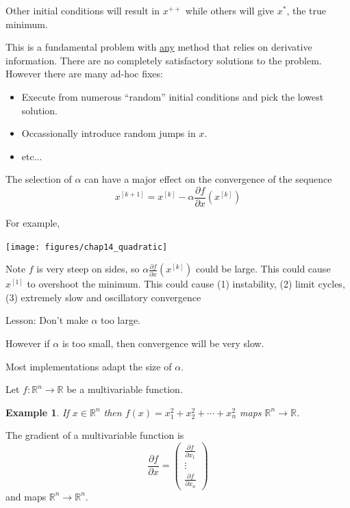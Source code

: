 \documentclass{article}
\newtheorem{example}[theorem]{Example}
\begin{document}
	Other initial conditions will result in 
	$x^{++}$ while others will give $x^\ast$, the true minimum.
	
	
	This is a fundamental problem with \underline{any} method that relies on derivative information.  There are no completely satisfactory solutions to the problem.  However there are many ad-hoc fixes:
		\begin{itemize}
		\item Execute from numerous ``random'' initial conditions and pick the lowest solution.
		\item Occassionally introduce random jumps in $x$.
		\item etc...
		\end{itemize}

\par{}
	The selection of $\alpha$ can have a major effect on the convergence of the sequence
	\[ 
		x^{[k+1]} = x^{[k]} - \alpha \frac{\partial f}{\partial x}(x^{[k]}) 
	\]
	
	For example,
	\begin{center}
		\texttt{[image: figures/chap14\_quadratic]}
	\end{center}
	Note $f$ is very steep on sides, so $\alpha \frac{\partial f}{\partial x}(x^{[k]})$ could be large.  This could cause $x^{[1]}$ to overshoot the minimum.  This could cause (1) instability, (2) limit cycles, (3) extremely slow and oscillatory convergence	

	{\color{blue}Lesson:}  
		Don't make $\alpha$ too large.
		
	
	However if $\alpha$ is too small, then convergence will be very slow.
	
	
	Most implementations adapt the size of $\alpha$.

	Let $f:\mathbb{R}^n\to\mathbb{R}$ be a multivariable function.
	\begin{example}
		If $x \in \mathbb{R}^n$ then 
		$f(x) = x_1^2 + x_2^2 + \cdots + x_n^2$ maps $\mathbb{R}^n\to\mathbb{R}$.	
	\end{example}
	The gradient of a multivariable function is
	\[ 
		\frac{\partial  f}{\partial  x} = \begin{pmatrix}
	    \frac{\partial  f}{\partial  x_1}\\
	    \vdots\\
	    \frac{\partial  f}{\partial  x_n}
	  \end{pmatrix} 
	\] 
	and maps $\mathbb{R}^n \to \mathbb{R}^n$.
\end{document}
